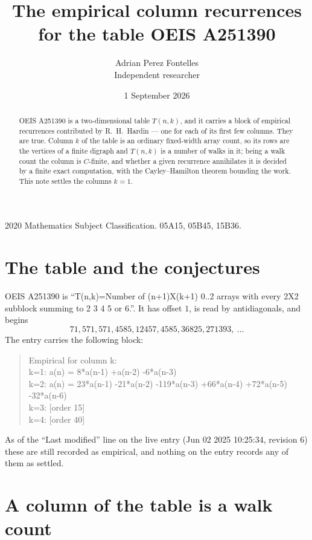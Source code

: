 \documentclass[11pt,a4paper]{article}
\title{The empirical column recurrences for the table OEIS A251390}
\author{Adrian Perez Fontelles\\ \small Independent researcher}
\date{1 September 2026}
\theoremstyle{plain}
\theoremstyle{definition}
\begin{document}
\maketitle

\begin{abstract}
OEIS A251390 is a two-dimensional table $T(n,k)$, and it carries a block of empirical
recurrences contributed by R.~H.~Hardin --- one for each of its first few columns. They are
true. Column $k$ of the table is an ordinary fixed-width array count, so its rows are the
vertices of a finite digraph and $T(n,k)$ is a number of walks in it; being a walk count the
column is $C$-finite, and whether a given recurrence annihilates it is decided by a finite
exact computation, with the Cayley--Hamilton theorem bounding the work. This note settles the columns $k=1$.
\end{abstract}

\noindent\small 2020 Mathematics Subject Classification. 05A15, 05B45, 15B36.\normalsize

\section{The table and the conjectures}

OEIS A251390 is ``T(n,k)=Number of (n+1)X(k+1) 0..2 arrays with every 2X2 subblock summing to 2 3 4 5 or 6.''. It has offset $1$, is
read by antidiagonals, and begins
\[
71, 571, 571, 4585, 12457, 4585, 36825, 271393,\ \dots
\]
The entry carries the following block:
\begin{quote}\small
Empirical for column k:\\
k=1: a(n) = 8*a(n-1) +a(n-2) -6*a(n-3)\\
k=2: a(n) = 23*a(n-1) -21*a(n-2) -119*a(n-3) +66*a(n-4) +72*a(n-5) -32*a(n-6)\\
k=3: [order 15]\\
k=4: [order 40]\\
\end{quote}
As of the ``Last modified'' line on the live entry (Jun 02 2025 10:25:34, revision 6) these are still
recorded as empirical, and nothing on the entry records any of them as settled.

\section{A column of the table is a walk count}
\end{document}
